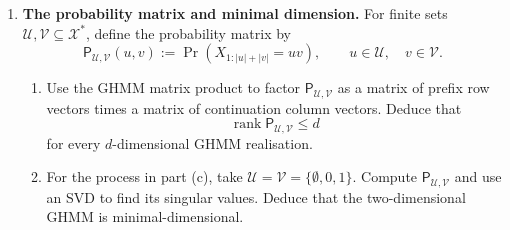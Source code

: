 \documentclass[11pt]{article}
\begin{document}
\begin{exercise}
\begin{enumerate}
    \item \textbf{The probability matrix and minimal dimension.}
      For finite sets $\mathcal U,\mathcal V\subseteq\mathcal X^*$, define
      the probability matrix by
      \[
        \mathsf P_{\mathcal U,\mathcal V}(u,v)
          :=\Pr(X_{1:|u|+|v|}=uv),
        \qquad u\in\mathcal U,\quad v\in\mathcal V.
      \]
      \begin{enumerate}
        \item Use the GHMM matrix product to factor
          $\mathsf P_{\mathcal U,\mathcal V}$ as a matrix of prefix row
          vectors times a matrix of continuation column vectors. Deduce that
          \[
            \operatorname{rank}\mathsf P_{\mathcal U,\mathcal V}\leq d
          \]
          for every $d$-dimensional GHMM realisation.

        \item For the process in part (c), take
          $\mathcal U=\mathcal V=\{\emptyset,0,1\}$. Compute
          $\mathsf P_{\mathcal U,\mathcal V}$ and use an SVD to find its
          singular values. Deduce that the two-dimensional GHMM is
          minimal-dimensional.
      \end{enumerate}

  \end{enumerate}
\end{exercise}
\end{document}
